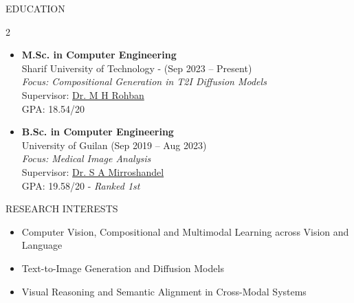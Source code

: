 \documentclass[]{CV}
\begin{document}
\resumeheader
{}
{}
{}
{}
{}

\vspace{-3mm}
\begin{section}{EDUCATION}
\vspace{-2mm}
\begin{multicols}{2}
\begin{itemize}
    \item \textbf{M.Sc. in Computer Engineering} \\
    Sharif University of Technology - (Sep 2023 -- Present) \\
    \textit{Focus: Compositional Generation in T2I Diffusion Models} \\
    Supervisor: \href{https://scholar.google.com/citations?user=pRyJ6FkAAAAJ}{Dr. M H Rohban} \\
    GPA: 18.54/20
\end{itemize}

\columnbreak

\begin{itemize}
    \item \textbf{B.Sc. in Computer Engineering} \\
    University of Guilan (Sep 2019 -- Aug 2023) \\
    \textit{Focus: Medical Image Analysis} \\
    Supervisor: \href{https://scholar.google.com/citations?user=Qh5IJ94AAAAJ}{Dr. S A Mirroshandel} \\
    GPA: 19.58/20 - \textit{Ranked 1st}
\end{itemize}
\end{multicols}
\end{section}

\vspace{-5mm}
\begin{section}{RESEARCH INTERESTS}
\begin{itemize}
    \item Computer Vision, Compositional and Multimodal Learning across Vision and Language
    \item Text-to-Image Generation and Diffusion Models
    \item Visual Reasoning and Semantic Alignment in Cross-Modal Systems
\end{itemize}
\end{section}
\end{document}
